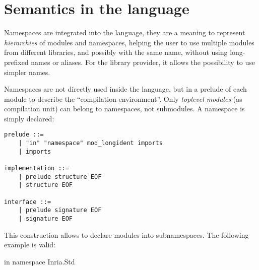 \section{Semantics in the language}

Namespaces are integrated into the language, they are a meaning to represent
\emph{hierarchies} of modules and namespaces, helping the user to use multiple
modules from different libraries, and possibly with the same name, without using
long-prefixed names or aliases. For the library provider, it allows the
possibility to use simpler names.

Namespaces are not directly used inside the language, but in a prelude of each
module to describe the ``compilation environment''. Only \emph{toplevel modules}
(as compilation unit) can belong to namespaces, not submodules. A namespace is
simply declared: 

\begin{verbatim}
prelude ::=
    | "in" "namespace" mod_longident imports 
    | imports

implementation ::=
    | prelude structure EOF
    | structure EOF

interface ::=
    | prelude signature EOF
    | signature EOF
\end{verbatim}

This construction allows to declare modules into subnamespaces. The following
example is valid:

\begin{OCaml}
in namespace Inria.Std
\end{OCaml}



